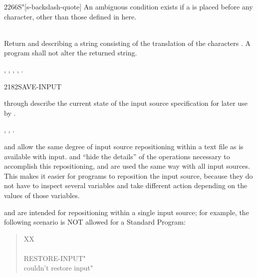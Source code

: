\begin{worddef}[Seq]{2266}{S\bs"}[s-backslash-quote]
	An ambiguous condition exists if a \bs{} is placed before any character,
	other than those defined in here.

\runtime {} \\
	Return  and  describing a string consisting of
	the translation of the characters .  A program shall not
	alter the returned string.

\see {},
	,
	,
	,
	.
\end{worddef}


\begin{worddef}{2182}{SAVE-INPUT}
\item {}

	 through  describe the current state of the
	input source specification for later use by .

\see {}, ,
	  .

	\begin{rationale} %
		 and  allow the same
		degree of input source repositioning within a text file as is
		available with  input. 
		and  ``hide the details'' of the operations
		necessary to accomplish this repositioning, and are used the
		same way with all input sources. This makes it easier for
		programs to reposition the input source, because they do not
		have to inspect several variables and take different action
		depending on the values of those variables.

		 and  are intended for
		repositioning within a single input source; for example, the
		following scenario is NOT allowed for a Standard Program:

		\begin{quote}\ttfamily
			\word{:} XX \\
			\tab {} ~  \\
			\tab {} RESTORE-INPUT"  \\
			\tab {} couldn't restore input" \\
			\word{;}
		\end{quote}


\end{rationale}
\end{worddef}
